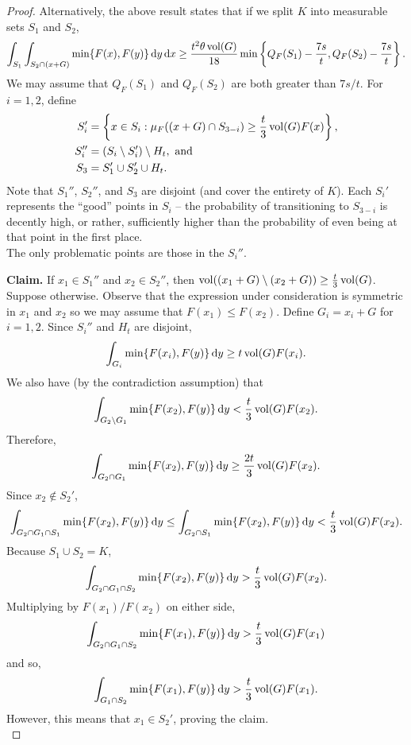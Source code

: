 \begin{proof}
	Alternatively, the above result states that if we split $K$ into measurable sets $S_1$ and $S_2$,
	\[ \int_{S_1} \int_{S_2\cap (x+G)} \min\{F(x),F(y)\}\operatorname{d}\!{y}\operatorname{d}\!{x} \geq \frac{t^2\theta\operatorname{vol}(G)}{18} \min\left\{Q_F(S_1)-\frac{7s}{t}, Q_F(S_2)-\frac{7s}{t}\right\}. \]
	We may assume that $Q_F(S_1)$ and $Q_F(S_2)$ are both greater than $7s/t$.
	For $i=1,2$, define
	\begin{align*}
		S_i' &= \left\{x\in S_i : \mu_F((x+G)\cap S_{3-i}) \geq \frac{t}{3}\operatorname{vol}(G)F(x) \right\}, \\
		S_i'' &= (S_i \setminus S_i') \setminus H_t,\text{ and} \\
		S_3 &= S_1'\cup S_2'\cup H_t.
	\end{align*}
	Note that $S_1''$, $S_2''$, and $S_3$ are disjoint (and cover the entirety of $K$). Each $S_i'$ represents the ``good'' points in $S_i$ -- the probability of transitioning to $S_{3-i}$ is decently high, or rather, sufficiently higher than the probability of even being at that point in the first place.\\
	The only problematic points are those in the $S_i''$.

	\textbf{Claim.} If $x_1\in S_1''$ and $x_2\in S_2''$, then $\operatorname{vol}((x_1+G)\setminus(x_2+G))\geq\frac{t}{3}\operatorname{vol}(G)$.\\
	Suppose otherwise. Observe that the expression under consideration is symmetric in $x_1$ and $x_2$ so we may assume that $F(x_1)\leq F(x_2)$. Define $G_i=x_i+G$ for $i=1,2$. Since $S_i''$ and $H_t$ are disjoint,
	\[ \int_{G_i} \min\{F(x_i), F(y)\}\operatorname{d}\!{y} \geq t\operatorname{vol}(G)F(x_i). \]
	We also have (by the contradiction assumption) that
	\[ \int_{G_2\setminus G_1} \min\{F(x_2),F(y)\}\operatorname{d}\!{y} < \frac{t}{3}\operatorname{vol}(G)F(x_2). \]
	Therefore,
	\[ \int_{G_2\cap G_1} \min\{F(x_2),F(y)\}\operatorname{d}\!{y} \geq \frac{2t}{3} \operatorname{vol}(G)F(x_2). \]
	Since $x_2\not\in S_2'$,
	\[ \int_{G_2\cap G_1\cap S_1} \min\{F(x_2),F(y)\}\operatorname{d}\!{y} \leq \int_{G_2\cap S_1} \min\{F(x_2),F(y)\}\operatorname{d}\!{y} < \frac{t}{3}\operatorname{vol}(G)F(x_2). \]
	Because $S_1\cup S_2 = K$,
	\[ \int_{G_2\cap G_1\cap S_2} \min\{F(x_2),F(y)\}\operatorname{d}\!{y} > \frac{t}{3}\operatorname{vol}(G)F(x_2). \]
	Multiplying by $F(x_1)/F(x_2)$ on either side,
	\[ \int_{G_2\cap G_1\cap S_2} \min\{F(x_1),F(y)\}\operatorname{d}\!{y} > \frac{t}{3}\operatorname{vol}(G)F(x_1) \]
	and so,
	\[ \int_{G_1\cap S_2} \min\{F(x_1),F(y)\}\operatorname{d}\!{y} > \frac{t}{3}\operatorname{vol}(G)F(x_1). \]
	However, this means that $x_1\in S_2'$, proving the claim.\\


\end{proof}
